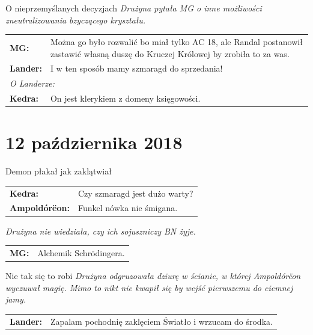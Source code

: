 \documentclass[10pt,twoside,twocolumn]{book}
\begin{document}
\begin{rpg-quotebox}{O nieprzemyślanych decyzjach}
   \textit{Drużyna pytała MG o inne możliwości zneutralizowania bzyczącego kryształu.}\\

   \begin{tabularx}{\columnwidth}{lX}
      \textbf{MG:} & Można go było rozwalić bo miał tylko AC 18, ale Randal postanowił zastawić własną duszę do Kruczej Królowej by zrobiła to za was.\\
      \textbf{Lander:} & I w ten sposób mamy szmaragd do sprzedania!\\
      \multicolumn{2}{l}{\textit{O Landerze:}}\\
      \textbf{Kedra:} &  On jest klerykiem z domeny księgowości.\\
   \end{tabularx}
\end{rpg-quotebox}


\section*{12 października 2018}

\begin{rpg-quotebox}{Demon płakał jak zaklątwiał}
   \begin{tabularx}{\columnwidth}{lX}
      \textbf{Kedra:} & Czy szmaragd jest dużo warty?\\
      \textbf{Ampoldórëon:} & Funkel nówka nie śmigana.\\
   \end{tabularx}
\end{rpg-quotebox}


\begin{rpg-quotebox}{}
   \textit{Drużyna nie wiedziała, czy ich sojuszniczy BN żyje.}\\

   \begin{tabularx}{\columnwidth}{lX}
      \textbf{MG:} & Alchemik Schrödingera.\\
   \end{tabularx}
\end{rpg-quotebox}


\begin{rpg-quotebox}{Nie tak się to robi}
   \textit{Drużyna odgruzowała dziurę w ścianie, w której Ampoldórëon wyczuwał magię. Mimo to nikt nie kwapił się by wejść pierwszemu do ciemnej jamy.}\\

   \begin{tabularx}{\columnwidth}{lX}
      \textbf{Lander:} & Zapalam pochodnię zaklęciem Światło i wrzucam do środka.\\
   \end{tabularx}
\end{rpg-quotebox}
\end{document}
